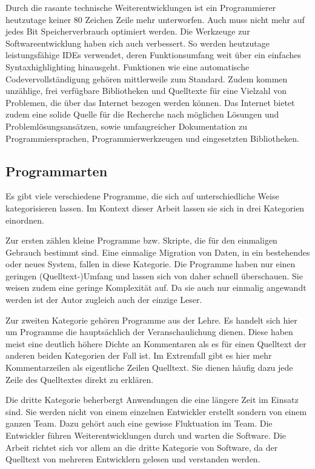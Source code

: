 Durch die rasante technische Weiterentwicklungen ist ein Programmierer heutzutage keiner
80 Zeichen Zeile mehr unterworfen. Auch muss nicht mehr auf jedes Bit Speicherverbrauch
optimiert werden. Die Werkzeuge zur Softwareentwicklung haben sich auch verbessert. So
werden heutzutage leistungsfähige IDEs verwendet, deren Funktionsumfang weit über ein
einfaches Syntaxhighlighting hinausgeht. Funktionen wie eine automatische Codevervollständigung
gehören mittlerweile zum Standard. Zudem kommen unzählige, frei verfügbare Bibliotheken und Quelltexte
für eine Vielzahl von Problemen, die über das Internet bezogen werden können. Das Internet bietet zudem
eine solide Quelle für die Recherche nach möglichen Lösungen und Problemlösungsansätzen, sowie
umfangreicher Dokumentation zu Programmiersprachen, Programmierwerkzeugen und eingesetzten Bibliotheken.

\subsection{Programmarten}

Es gibt viele verschiedene Programme, die sich auf unterschiedliche Weise kategorisieren lassen. Im Kontext dieser Arbeit lassen sie sich in drei Kategorien einordnen.

Zur ersten zählen kleine Programme bzw. Skripte, die für den einmaligen
Gebrauch bestimmt sind. Eine einmalige Migration von Daten, in ein bestehendes
oder neues System, fallen in diese Kategorie. Die Programme haben nur einen
geringen (Quelltext-)Umfang und lassen sich von daher schnell überschauen. Sie weisen zudem eine geringe Komplexität auf. Da sie auch nur einmalig angewandt werden ist der Autor zugleich auch der einzige Leser.

Zur zweiten Kategorie gehören Programme aus der Lehre. Es handelt sich hier um Programme die hauptsächlich der Veranschaulichung dienen. Diese haben meist eine
deutlich höhere Dichte an Kommentaren als es für einen Quelltext der anderen
beiden Kategorien der Fall ist. Im Extremfall gibt es hier mehr Kommentarzeilen als eigentliche Zeilen Quelltext.  Sie dienen häufig dazu jede Zeile des Quelltextes direkt zu erklären.

Die dritte Kategorie beherbergt Anwendungen die eine längere Zeit im Einsatz sind.
Sie werden nicht von einem einzelnen Entwickler erstellt sondern von einem ganzen Team. Dazu gehört auch eine gewisse Fluktuation im Team. Die Entwickler führen Weiterentwicklungen durch und warten die Software. Die Arbeit richtet sich vor allem an die dritte Kategorie von Software, da der Quelltext von mehreren Entwicklern gelesen und 
verstanden werden.

